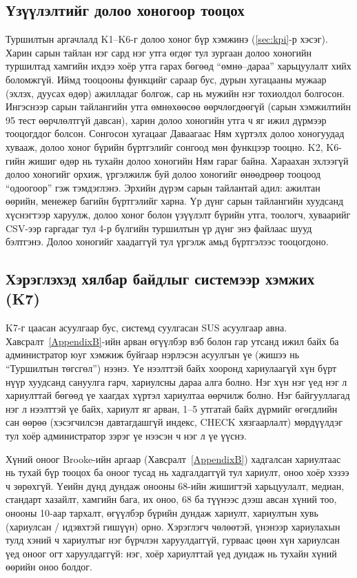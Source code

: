 \subsection{Үзүүлэлтийг долоо хоногоор тооцох}
\label{sec:weekly}
Туршилтын аргачлалд K1--K6-г долоо хоног бүр хэмжинэ (\ref{sec:kpi}-р хэсэг). Харин сарын тайлан нэг сард нэг утга өгдөг тул зургаан долоо хоногийн туршилтад хамгийн ихдээ хоёр утга гарах бөгөөд ``өмнө--дараа'' харьцуулалт хийх боломжгүй. Иймд тооцооны функцийг сараар бус, дурын хугацааны мужаар (эхлэх, дуусах өдөр) ажилладаг болгож, сар нь мужийн нэг тохиолдол болгосон. Ингэснээр сарын тайлангийн утга өмнөхөөсөө өөрчлөгдөөгүй (сарын хэмжилтийн 95 тест өөрчлөлтгүй давсан), харин долоо хоногийн утга ч яг ижил дүрмээр тооцогддог болсон. Сонгосон хугацааг Даваагаас Ням хүртэлх долоо хоногуудад хувааж, долоо хоног бүрийн бүртгэлийг сонгоод мөн функцээр тооцно. K2, K6-гийн жишиг өдөр нь тухайн долоо хоногийн Ням гараг байна. Хараахан эхлээгүй долоо хоногийг орхиж, үргэлжилж буй долоо хоногийг өнөөдрөөр тооцоод ``одоогоор'' гэж тэмдэглэнэ. Эрхийн дүрэм сарын тайлантай адил: ажилтан өөрийн, менежер багийн бүртгэлийг харна. Үр дүнг сарын тайлангийн хуудсанд хүснэгтээр харуулж, долоо хоног болон үзүүлэлт бүрийн утга, тоологч, хуваарийг CSV-ээр гаргадаг тул 4-р бүлгийн туршилтын үр дүнг энэ файлаас шууд бэлтгэнэ. Долоо хоногийг хаадаггүй тул үргэлж амьд бүртгэлээс тооцогдоно.

\subsection{Хэрэглэхэд хялбар байдлыг системээр хэмжих (K7)}
\label{sec:sus}
K7-г цаасан асуулгаар бус, системд суулгасан SUS асуулгаар авна. Хавсралт~\ref{AppendixB}-ийн арван өгүүлбэр вэб болон гар утсанд ижил байх ба администратор юуг хэмжиж буйгаар нэрлэсэн асуулгын үе (жишээ нь ``Туршилтын төгсгөл'') нээнэ. Үе нээлттэй байх хооронд хариулаагүй хүн бүрт нүүр хуудсанд сануулга гарч, хариулсны дараа алга болно. Нэг хүн нэг үед нэг л хариулттай бөгөөд үе хаагдах хүртэл хариултаа өөрчилж болно. Нэг байгууллагад нэг л нээлттэй үе байх, хариулт яг арван, 1--5 утгатай байх дүрмийг өгөгдлийн сан өөрөө (хэсэгчилсэн давтагдашгүй индекс, CHECK хязгаарлалт) мөрдүүлдэг тул хоёр администратор зэрэг үе нээсэн ч нэг л үе үүснэ.

Хүний оноог Brooke-ийн аргаар (Хавсралт~\ref{AppendixB}) хадгалсан хариултаас нь тухай бүр тооцох ба оноог тусад нь хадгалдаггүй тул хариулт, оноо хоёр хэзээ ч зөрөхгүй. Үеийн дүнд дундаж онооны 68-ийн жишигтэй харьцуулалт, медиан, стандарт хазайлт, хамгийн бага, их оноо, 68 ба түүнээс дээш авсан хүний тоо, онооны 10-аар тархалт, өгүүлбэр бүрийн дундаж хариулт, хариултын хувь (хариулсан / идэвхтэй гишүүн) орно. Хэрэглэгч чөлөөтэй, үнэнээр хариулахын тулд хэний ч хариултыг нэг бүрчлэн харуулдаггүй, гурваас цөөн хүн хариулсан үед оноог огт харуулдаггүй: нэг, хоёр хариулттай үед дундаж нь тухайн хүний өөрийн оноо болдог.

